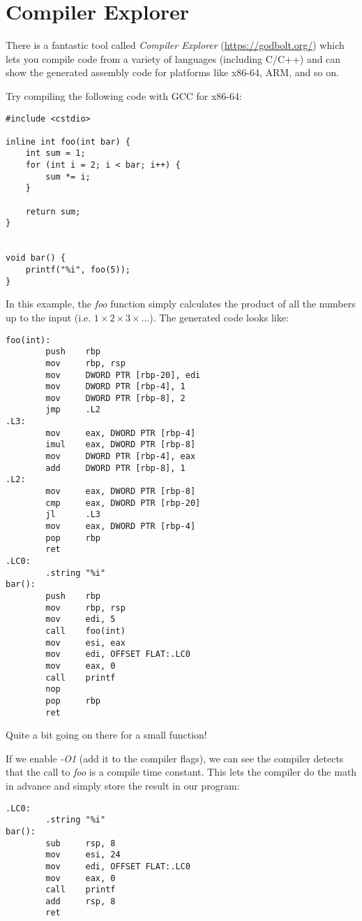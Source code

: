 \documentclass[a4paper,11pt]{article}
\begin{document}
\section{Compiler Explorer}

There is a fantastic tool called \emph{Compiler Explorer}
(\url{https://godbolt.org/}) which lets you compile code from a variety of
languages (including C/C++) and can show the generated assembly code for
platforms like x86-64, ARM, and so on.

Try compiling the following code with GCC for x86-64:
\begin{verbatim}
#include <cstdio>

inline int foo(int bar) {
    int sum = 1;
    for (int i = 2; i < bar; i++) {
        sum *= i;
    }

    return sum;
}


void bar() {
    printf("%i", foo(5));
}
\end{verbatim}

In this example, the \emph{foo} function simply calculates the product of all
the numbers up to the input (i.e. $1 \times 2 \times 3 \times \ldots$). The
generated code looks like:

\begin{verbatim}
foo(int):
        push    rbp
        mov     rbp, rsp
        mov     DWORD PTR [rbp-20], edi
        mov     DWORD PTR [rbp-4], 1
        mov     DWORD PTR [rbp-8], 2
        jmp     .L2
.L3:
        mov     eax, DWORD PTR [rbp-4]
        imul    eax, DWORD PTR [rbp-8]
        mov     DWORD PTR [rbp-4], eax
        add     DWORD PTR [rbp-8], 1
.L2:
        mov     eax, DWORD PTR [rbp-8]
        cmp     eax, DWORD PTR [rbp-20]
        jl      .L3
        mov     eax, DWORD PTR [rbp-4]
        pop     rbp
        ret
.LC0:
        .string "%i"
bar():
        push    rbp
        mov     rbp, rsp
        mov     edi, 5
        call    foo(int)
        mov     esi, eax
        mov     edi, OFFSET FLAT:.LC0
        mov     eax, 0
        call    printf
        nop
        pop     rbp
        ret
\end{verbatim}

Quite a bit going on there for a small function!

If we enable \emph{-O1} (add it to the compiler flags), we can see the compiler
detects that the call to \emph{foo} is a compile time constant. This lets the
compiler do the math in advance and simply store the result in our program:

\begin{verbatim}
.LC0:
        .string "%i"
bar():
        sub     rsp, 8
        mov     esi, 24
        mov     edi, OFFSET FLAT:.LC0
        mov     eax, 0
        call    printf
        add     rsp, 8
        ret
\end{verbatim}
\end{document}
